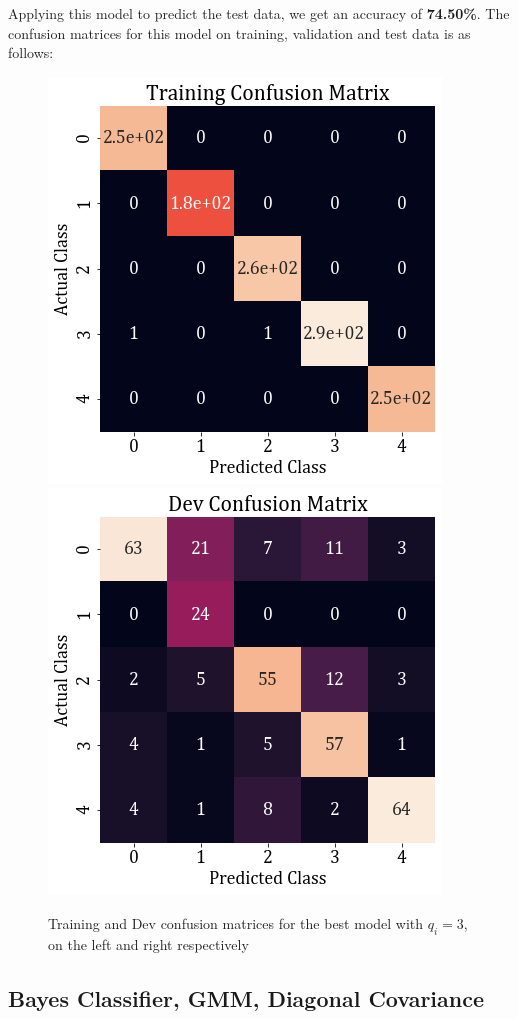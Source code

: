 \documentclass[11pt,a4paper]{article}
\newcommand{\noi}{\noindent}
\begin{document}
\noi
Applying this model to predict the test data, we get an accuracy of \textbf{74.50\%}. The confusion matrices for this model on training, validation and test data is as follows:
\begin{figure}[H]
    \centering
    \includegraphics[scale=0.6]{images/2B/2B_full_train_conf.png}
    \includegraphics[scale=0.6]{images/2B/2B_full_dev_conf.png}
    \caption{Training and Dev confusion matrices for the best model with $q_i=3$, on the left and right respectively}
\end{figure}

\subsection{Bayes Classifier, GMM, Diagonal Covariance}
\end{document}
